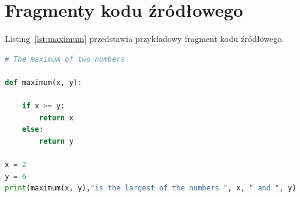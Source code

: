 \documentclass[polish]{aghengthesis}
\newcommand{\listofalgorithmes}{\tocfile{\listalgorithmcfname}{loa}}
\renewcommand\lstlistlistingname{\LangListOfListings}
\renewcommand{\lstlistoflistings}{\begingroup
\tocfile{\lstlistlistingname}{lol}
\endgroup}
\begin{document}
\section{Fragmenty kodu źródłowego}
\label{sec:listingi}
Listing~\ref{lst:maximum} przedstawia przykładowy fragment kodu źródłowego.

\begin{lstlisting}[language=Python,float=!htbp,caption={[Przykładowy fragment kodu]Przykładowy fragment kodu (źródło:
  \cite{author2021title})},label=lst:maximum]
# The maximum of two numbers

def maximum(x, y):

    if x >= y:
        return x
    else:
        return y

x = 2
y = 6
print(maximum(x, y),"is the largest of the numbers ", x, " and ", y)

\end{lstlisting}

\printbibliography

\listoffigures
\listoftables
\listofalgorithmes
\lstlistoflistings
\end{document}
